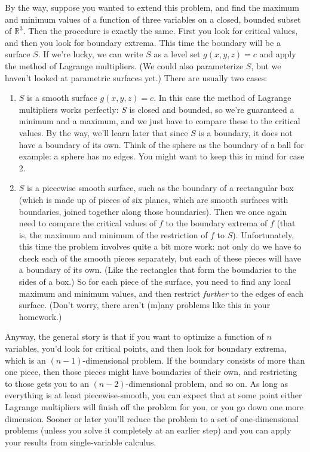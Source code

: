 \documentclass[12pt,letterpaper]{article}
\newcommand{\R}{\mathbb{R}}
\begin{document}
By the way, suppose you wanted to extend this problem, and find the maximum and minimum values of a function of three variables on a closed, bounded subset of $\R^3$. Then the procedure is exactly the same. First you look for critical values, and then you look for boundary extrema. This time the boundary will be a surface $S$. If we're lucky, we can write $S$ as a level set $g(x,y,z)=c$ and apply the method of Lagrange multipliers. (We could also parameterize $S$, but we haven't looked at parametric surfaces yet.) There are usually two cases:
\begin{enumerate}
\item $S$ is a smooth surface $g(x,y,z)=c$. In this case the method of Lagrange multipliers works perfectly: $S$ is closed and bounded, so we're guaranteed a minimum and a maximum, and we just have to compare these to the critical values. By the way, we'll learn later that since $S$ is a boundary, it does not have a boundary of its own. Think of the sphere as the boundary of a ball for example: a sphere has no edges. You might want to keep this in mind for case 2.
\item $S$ is a piecewise smooth surface, such as the boundary of a rectangular box (which is made up of pieces of six planes, which are smooth surfaces with boundaries, joined together along those boundaries). Then we once again need to compare the critical values of $f$ to the boundary extrema of $f$ (that is, the maximum and minimum of the restriction of $f$ to $S$). Unfortunately, this time the problem involves quite a bit more work: not only do we have to check each of the smooth pieces separately, but each of these pieces will have a boundary of its own. (Like the rectangles that form the boundaries to the sides of a box.) So for each piece of the surface, you need to find any local maximum and minimum values, and then restrict {\em further} to the edges of each surface. (Don't worry, there aren't (m)any problems like this in your homework.)
\end{enumerate}
Anyway, the general story is that if you want to optimize a function of $n$ variables, you'd look for critical points, and then look for boundary extrema, which is an $(n-1)$-dimensional problem. If the boundary consists of more than one piece, then those pieces might have boundaries of their own, and restricting to those gets you to an $(n-2)$-dimensional problem, and so on. As long as everything is at least piecewise-smooth, you can expect that at some point either Lagrange multipliers will finish off the problem for you, or you go down one more dimension. Sooner or later you'll reduce the problem to a set of one-dimensional problems (unless you solve it completely at an earlier step) and you can apply your results from single-variable calculus.
\end{document}
